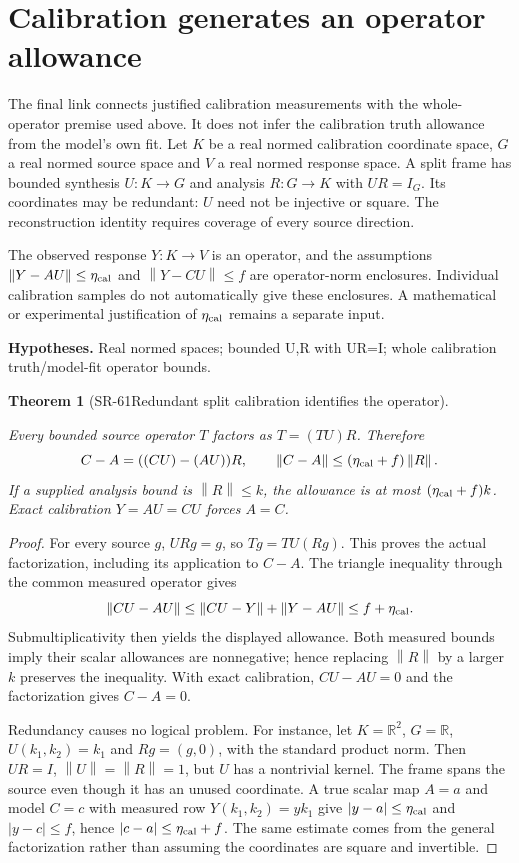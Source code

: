 \documentclass[11pt]{article}
\newtheorem{theorem}{Theorem}[section]
\theoremstyle{definition}\newtheorem{definition}[theorem]{Definition}
\theoremstyle{remark}\newtheorem{remark}[theorem]{Remark}
\newcommand{\RR}{\mathbb R}\newcommand{\QQ}{\mathbb Q}
\newcommand{\nn}[1]{\left\lVert #1\right\rVert}
\begin{document}
\section{Calibration generates an operator allowance}

The final link connects justified calibration measurements with the
whole-operator premise used above. It does not infer the calibration truth
allowance from the model's own fit. Let $K$ be a real normed calibration
coordinate space, $G$ a real normed source space and $V$ a real normed
response space. A split frame has bounded synthesis $U:K\to G$ and
analysis $R:G\to K$ with $UR=I_G$. Its coordinates may be redundant:
$U$ need not be injective or square. The reconstruction identity requires
coverage of every source direction.

The observed response $Y:K\to V$ is an operator, and the assumptions
$\nn{Y-AU}\le\eta_{\rm cal}$ and $\nn{Y-CU}\le f$ are operator-norm
enclosures. Individual calibration samples do not automatically give these
enclosures. A mathematical or experimental justification of
$\eta_{\rm cal}$ remains a separate input.


\par{\small\textbf{Hypotheses.} Real normed spaces; bounded U,R with UR=I; whole calibration truth/\allowbreak model-fit operator bounds.}\par

\begin{theorem}[SR-61\quad Redundant split calibration identifies the operator]\label{SR-61}

Every bounded source operator $T$ factors as $T=(TU)R$. Therefore
\[
C-A=((CU)-(AU))R,\qquad
\nn{C-A}\le(\eta_{\rm cal}+f)\nn R .
\]
If a supplied analysis bound is $\nn R\le k$, the allowance is at most
$(\eta_{\rm cal}+f)k$. Exact calibration $Y=AU=CU$ forces $A=C$.

\end{theorem}
\begin{proof}

For every source $g$, $URg=g$, so $Tg=TU(Rg)$. This proves the actual
factorization, including its application to $C-A$.
The triangle inequality through the common measured operator gives
\[
\nn{CU-AU}\le\nn{CU-Y}+\nn{Y-AU}
\le f+\eta_{\rm cal}.
\]
Submultiplicativity then yields the displayed allowance.
Both measured bounds imply their scalar allowances are nonnegative;
hence replacing $\nn R$ by a larger $k$ preserves the inequality.
With exact calibration, $CU-AU=0$ and the factorization gives $C-A=0$.

Redundancy causes no logical problem. For instance, let
$K=\RR^2$, $G=\RR$, $U(k_1,k_2)=k_1$ and $Rg=(g,0)$, with the
standard product norm. Then $UR=I$, $\nn U=\nn R=1$, but
$U$ has a nontrivial kernel. The frame spans the source even though
it has an unused coordinate. A true scalar map $A=a$ and model $C=c$
with measured row $Y(k_1,k_2)=yk_1$ give
$|y-a|\le\eta_{\rm cal}$ and $|y-c|\le f$,
hence $|c-a|\le\eta_{\rm cal}+f$.
The same estimate comes from the general factorization rather than
assuming the coordinates are square and invertible.

\end{proof}
\end{document}
